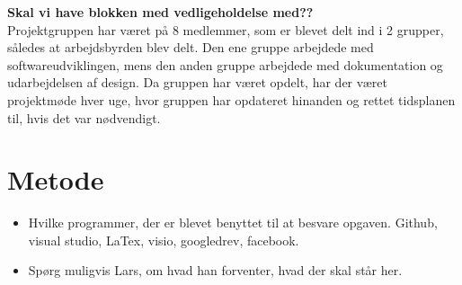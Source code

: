 \textbf{Skal vi have blokken med vedligeholdelse med??}\\
Projektgruppen har været på 8 medlemmer, som er blevet delt ind i 2 grupper, således at arbejdsbyrden blev delt. Den ene gruppe arbejdede med softwareudviklingen, mens den anden gruppe arbejdede med dokumentation og udarbejdelsen af design. Da gruppen har været opdelt, har der været projektmøde hver uge, hvor gruppen har opdateret hinanden og rettet tidsplanen til, hvis det var nødvendigt.


\section{Metode}

\begin{itemize}
	\item Hvilke programmer, der er blevet benyttet til at besvare opgaven. Github, visual studio, LaTex, visio, googledrev, facebook. 
	\item Spørg muligvis Lars, om hvad han forventer, hvad der skal står her. 
\end{itemize}



